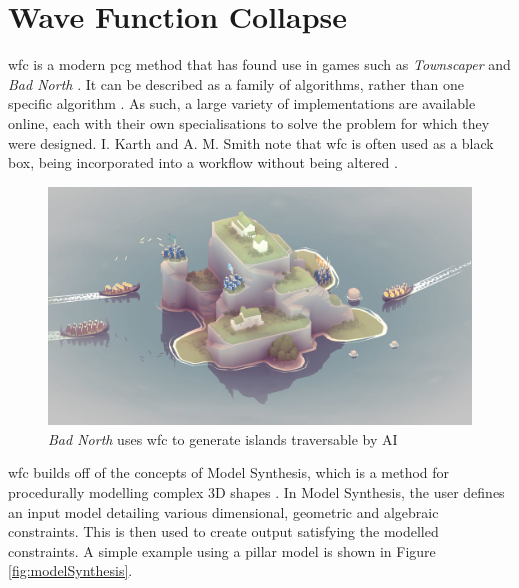 
\section{Wave Function Collapse}
\acrshort{wfc} \cite{Gumin_Wave_Function_Collapse_2016} is a modern \acrshort{pcg} method that has found use in games such as \textit{Townscaper} \cite{townscaper} and \textit{Bad North} \cite{badnorth}. It can be described as a family of algorithms, rather than one specific algorithm \cite{WFC_ConstraintSolving_and_ML}. As such, a large variety of implementations are available online, each with their own specialisations to solve the problem for which they were designed. I. Karth and A. M. Smith note that \acrshort{wfc} is often used as a black box, being incorporated into a workflow without being altered \cite{WFC_In_The_Wild}.

\begin{figure}[H]
    \centering
    \includegraphics[width=\textwidth, height=0.3\textheight, keepaspectratio]{Images/BadNorth.jpg}
    \caption{\textit{Bad North} uses \acrshort{wfc} to generate islands traversable by AI \cite{badnorth}}
    \label{fig:badNorth}
\end{figure}

\acrshort{wfc} builds off of the concepts of Model Synthesis, which is a method for procedurally modelling complex 3D shapes \cite{model_synthesis, model_synthesis_diss}. In Model Synthesis, the user defines an input model detailing various dimensional, geometric and algebraic constraints. This is then used to create output satisfying the modelled constraints. A simple example using a pillar model is shown in Figure \ref{fig:modelSynthesis}.

